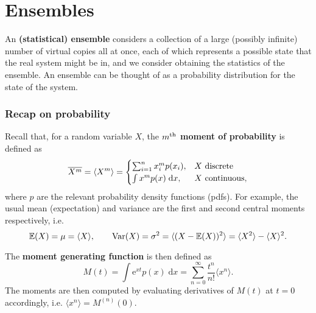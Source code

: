 \documentclass[letter-paper]{tufte-book}
\newcommand\Def[1]{\textbf{#1}}
\begin{document}

\chapter{Ensembles}

An \Def{(statistical) ensemble} considers a collection of a large (possibly
infinite) number of virtual copies all at once, each of which represents a
possible state that the real system might be in, and we consider obtaining the
statistics of the ensemble. An ensemble
can be thought of as a probability distribution for the state of the system.


\subsection{Recap on probability}

Recall that, for a random variable $X$, the \Def{$m^{\textnormal{th}}$ moment of
probability} is defined as
\begin{equation}
  \overline{X^m} = \langle X^m \rangle = \begin{cases} \sum_{i=1}^n x_i^m p(x_i), & X \textnormal{ discrete} \\ \int x^m p(x)\; \mathrm{d}x, & X \textnormal{ continuous},\end{cases}
\end{equation}
where $p$ are the relevant probability density functions (pdfs). For example,
the usual mean (expectation) and variance are the first and second central
moments respectively, i.e.
\begin{equation*}
  \mathbb{E}(X) = \mu = \langle X \rangle, \qquad \textnormal{Var}(X) = \sigma^2 = \langle (X - \mathbb{E}(X))^2 \rangle = \langle X^2 \rangle - \langle X \rangle^2.
\end{equation*}

The \Def{moment generating function} is then defined as
\begin{equation}
  M(t) = \int \mathrm{e}^{xt} p(x)\; \mathrm{d}x = \sum_{n=0}^\infty \frac{t^n}{n!}\langle x^n\rangle.
\end{equation}
The moments are then computed by evaluating derivatives of $M(t)$ at $t=0$
accordingly, i.e. $\langle x^n\rangle = M^{(n)}(0)$.
\end{document}
